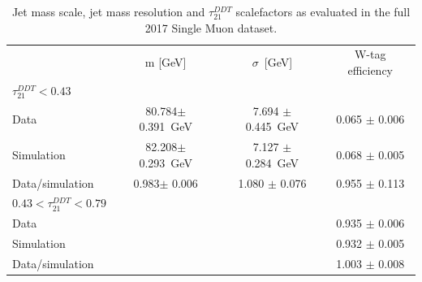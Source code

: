  \begin{table}[htbp]
    \centering
    \begin{tabular}{|lccc|}
    \hline
    & m [GeV]           & $\sigma$~[GeV]     & W-tag efficiency\\
    $\tau_{21}^{DDT} < 0.43$ & &&\\ \hline
    \hline
    Data            & 80.784$\pm$ 0.391~GeV   & 7.694 $\pm$ 0.445~GeV & 0.065 $\pm$ 0.006\\
    Simulation      & 82.208$\pm$ 0.293~GeV   & 7.127 $\pm$ 0.284~GeV & 0.068 $\pm$ 0.005\\
    \hline
    Data/simulation & 0.983$\pm$ 0.006       & 1.080 $\pm$ 0.076     & 0.955 $\pm$ 0.113\\
    \hline
    $0.43 < \tau_{21}^{DDT} < 0.79$ & &&\\ \hline
    \hline
    Data            &    &  & 0.935 $\pm$ 0.006\\
    Simulation      &    &  & 0.932 $\pm$ 0.005\\
    \hline
    Data/simulation &    &   & 1.003 $\pm$ 0.008\\
    \hline
    \end{tabular}
    \caption{Jet mass scale, jet mass resolution and $\tau_{21}^{DDT}$ scalefactors as evaluated in the full 2017 Single Muon dataset.}
    \label{tab:wsf}
 \end{table}
